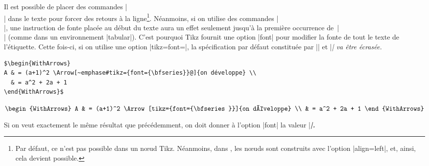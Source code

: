 \documentclass[dvipsnames]{article}%
\def\interitem{\vspace{7mm plus 2 mm minus 3mm}}
\begin{document}
\interitem 
Il est possible de placer des commandes |\\| dans le texte pour forcer des retours à la ligne\footnote{Par
défaut, ce n'est pas possible dans un nœud Tikz. Néanmoins, dans ,
les nœuds sont construits avec l'option |align=left|, et, ainsi, cela devient possible.}. Néanmoins, si on utilise des commandes |\\|, une instruction de fonte placée au début
du texte aura un effet seulement jusqu'à la première occurrence de~|\\| (comme
dans un environnement |{tabular}|). C'est pourquoi Tikz fournit une option
|font| pour modifier la fonte de tout le texte de l'étiquette. Cette fois-ci, si on utilise une option
|tikz={font={\bfseries}}|, la spécification par défaut constituée par |\small| et |\itshape| va être
écrasée. 
%
\begin{Verbatim}
$\begin{WithArrows}
A & = (a+1)^2 \Arrow[~emphase#tikz={font={\bfseries}}@]{on développe} \\
  & = a^2 + 2a + 1 
\end{WithArrows}$
\end{Verbatim}

$\begin{WithArrows}
A & = (a+1)^2 \Arrow[tikz={font={\bfseries}}]{on développe} \\
  & = a^2 + 2a + 1 
\end{WithArrows}$

\medskip
Si on veut exactement le même résultat que précédemment, on doit donner à l'option |font| la valeur
|\itshape\small\bfseries|.
\end{document}
